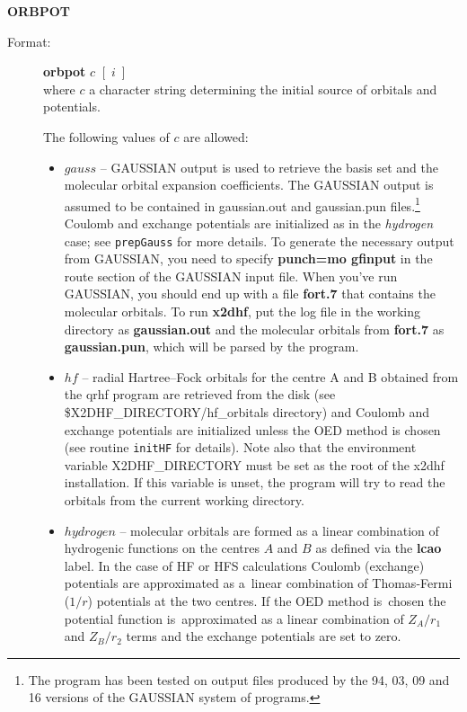\documentclass[10pt,a4paper]{article}
\newcommand{\ft}[1]{\texttt{#1}}
\begin{document}
\begin{description}
\item \textbf{ORBPOT}
\begin{description}
\item[Format:] \textbf{orbpot} $c$ $[\; i \;]$\\
  where $c$ a character string determining the initial source of orbitals
  and potentials.

  The following values of $c$ are allowed:
\begin{itemize}

\item $gauss$ -- GAUSSIAN output is used to retrieve the basis set and the
  molecular orbital expansion coefficients. The GAUSSIAN output is assumed
  to be contained in gaussian.out and gaussian.pun files.\footnote{The
    program has been tested on output files produced by the 94, 03, 09 and
    16 versions of the GAUSSIAN system of programs.} Coulomb and exchange
  potentials are initialized as in the \textsl{hydrogen} case; see
  \ft{prepGauss} for more details. To generate the necessary output from
  GAUSSIAN, you need to specify {\bf punch=mo gfinput} in the route section
  of the GAUSSIAN input file. When you've run GAUSSIAN, you should end up
  with a file {\bf fort.7} that contains the molecular orbitals. To run
  {\bf x2dhf}, put the log file in the working directory as {\bf
    gaussian.out} and the molecular orbitals from {\bf fort.7} as {\bf
    gaussian.pun}, which will be parsed by the program.

\item $hf$ -- radial Hartree--Fock orbitals for the centre A and B obtained
  from the qrhf program are retrieved from the disk (see
  \$X2DHF\_DI\-REC\-TO\-RY/\-hf\_orbitals directory) and Coulomb and
  exchange potentials are initialized unless the OED method is chosen (see
  routine \ft{initHF} for details). Note also that the environment
  variable X2DHF\_DIRECTORY must be set as the root of the x2dhf
  installation. If this variable is unset, the program will try to
  read the orbitals from the current working directory.
  
\item $hydrogen$ -- molecular orbitals are formed as a linear combination
  of hydrogenic functions on the centres $A$ and $B$ as defined via the
  \textbf{lcao} label. In the case of HF or HFS calculations Coulomb
  (exchange) potentials are approximated as a~linear combination of
  Thomas-Fermi ($1/r$) potentials at the two centres. If the OED method
  is~chosen the potential function is~approximated as a linear combination
  of $Z_A/r_1$ and $Z_B/r_2$ terms and the exchange potentials are set to
  zero.


\end{itemize}
\end{description}
\end{description}
\end{document}
